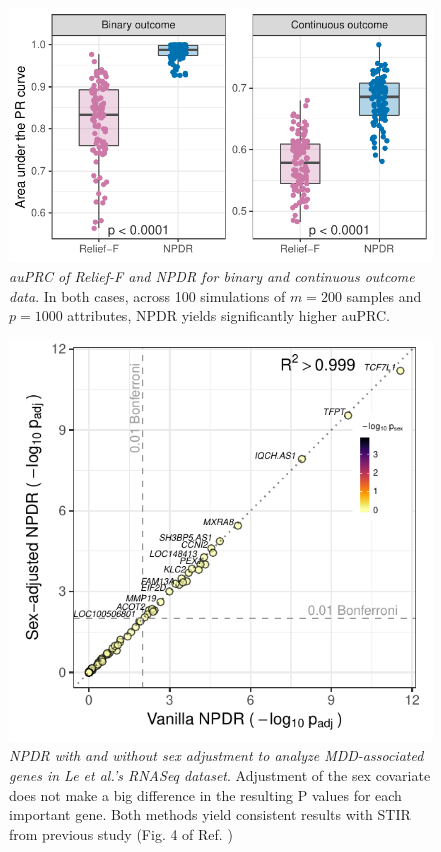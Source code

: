 \documentclass{article}
\begin{document}
\begin{figure}[h]%
\centerline{\includegraphics[]{../figs/pr_compare_100.pdf}}
\caption{\emph{auPRC of Relief-F and NPDR for binary and continuous outcome data}. In both cases, across 100 simulations of $m = 200$ samples and $p = 1000$ attributes, NPDR yields significantly higher auPRC.}
\label{fig:auPRC}
\end{figure}



\begin{figure}[h]%
\centerline{\includegraphics[]{../figs/jerzy_npdrs_mdd.pdf}}
\caption{\emph{NPDR with and without sex adjustment to analyze MDD-associated genes in Le et al.'s RNASeq dataset}. Adjustment of the sex covariate does not make a big difference in the resulting P values for each important gene. Both methods yield consistent results with STIR from previous study (Fig. 4 of Ref. \cite{stir})}
\label{fig:jerzy_npdrs_mdd}
\end{figure}
\end{document}
